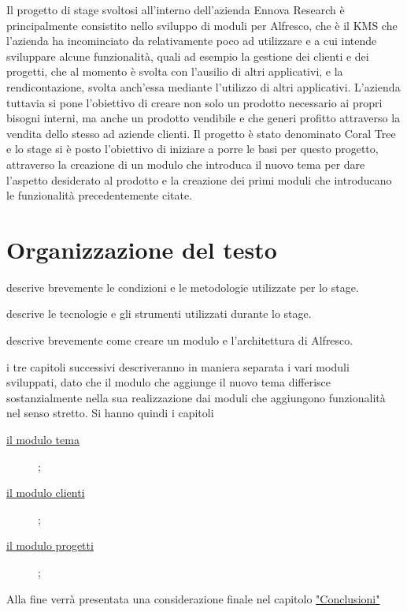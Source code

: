 Il progetto di stage svoltosi all’interno dell’azienda Ennova Research è principalmente consistito nello sviluppo di moduli per Alfresco, che è il \gls{KMS} che l'azienda ha incominciato da relativamente poco ad utilizzare e a cui intende sviluppare alcune funzionalità, quali ad esempio la gestione dei clienti e dei progetti, che al momento è svolta con l'ausilio di altri applicativi, e la rendicontazione, svolta anch'essa mediante l'utilizzo di altri applicativi.
L'azienda tuttavia si pone l'obiettivo di creare non solo un prodotto necessario ai propri bisogni interni, ma anche un prodotto vendibile e che generi profitto attraverso la vendita dello stesso ad aziende clienti. Il progetto è stato denominato Coral Tree e lo stage si è posto l'obiettivo di iniziare a porre le basi per questo progetto, attraverso la creazione di un modulo che introduca il nuovo tema per dare l'aspetto desiderato al prodotto e la creazione dei primi moduli che introducano le funzionalità precedentemente citate.

\section{Organizzazione del testo}
\begin{description}
    \item[{\hyperref[cap:descrizione-stage]{Il secondo capitolo}}] descrive brevemente le condizioni e le metodologie utilizzate per lo stage.
    \item[{\hyperref[cap:tecnologie-strumenti]{Il terzo capitolo}}] descrive le tecnologie e gli strumenti utilizzati durante lo stage.    
		 \item[{\hyperref[cap:architettura]{Il quarto  capitolo}}] descrive brevemente come creare un modulo e l'architettura di Alfresco.
		\item i tre capitoli successivi descriveranno in maniera separata i vari moduli sviluppati, dato che il modulo che aggiunge il nuovo tema differisce
		sostanzialmente nella sua realizzazione dai moduli che aggiungono funzionalità nel senso stretto.
		Si hanno quindi i capitoli
		\begin{description}
		\item[{\hyperref[cap:modulo-tema]{il modulo tema}}];
		\item[{\hyperref[cap:modulo-clienti]{il modulo clienti}}];
		\item[{\hyperref[cap:modulo-progetti]{ il modulo progetti}}];
		\end{description}		
		Alla fine verrà presentata una considerazione finale nel capitolo \hyperref[cap:conclusioni]{"Conclusioni"}
\end{description}